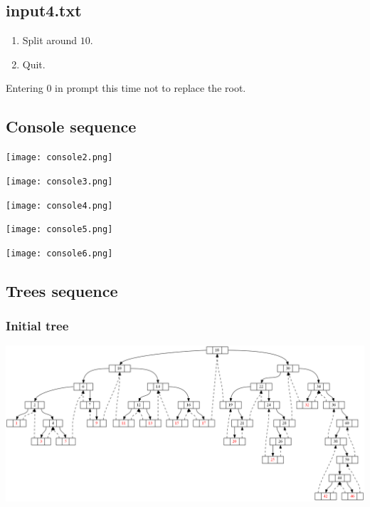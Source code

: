 \documentclass{article}
\begin{document}
\subsection{input4.txt}
\begin{enumerate}
	\item Split around $10$.
	\item Quit.
\end{enumerate}
Entering $0$ in prompt this time not to replace the root.
\subsection{Console sequence}
\begin{center}
\texttt{[image: console2.png]}
\end{center}
\begin{center}
\texttt{[image: console3.png]}
\end{center}
\begin{center}
\texttt{[image: console4.png]}
\end{center}
\begin{center}
\texttt{[image: console5.png]}
\end{center}
\begin{center}
\texttt{[image: console6.png]}
\end{center}

\subsection{Trees sequence}
\subsubsection{Initial tree}
\begin{center}
\includegraphics[scale=0.3]{struct0.png}
\end{center}
\end{document}
